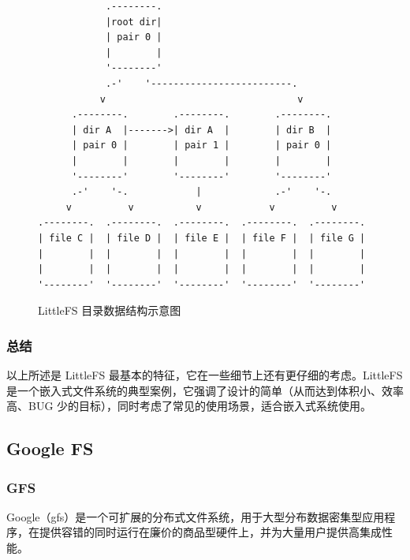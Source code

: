 \documentclass{ctexart}
\begin{document}
\begin{figure}
\begin{verbatim}
            .--------.
            |root dir|
            | pair 0 |
            |        |
            '--------'
            .-'    '-------------------------.
           v                                  v
      .--------.        .--------.        .--------.
      | dir A  |------->| dir A  |        | dir B  |
      | pair 0 |        | pair 1 |        | pair 0 |
      |        |        |        |        |        |
      '--------'        '--------'        '--------'
      .-'    '-.            |             .-'    '-.
     v          v           v            v          v
.--------.  .--------.  .--------.  .--------.  .--------.
| file C |  | file D |  | file E |  | file F |  | file G |
|        |  |        |  |        |  |        |  |        |
|        |  |        |  |        |  |        |  |        |
'--------'  '--------'  '--------'  '--------'  '--------'
\end{verbatim}
\caption{LittleFS 目录数据结构示意图}
\end{figure}

\subsubsection{总结}

以上所述是 LittleFS 最基本的特征，它在一些细节上还有更仔细的考虑。LittleFS 是一个嵌入式文件系统的典型案例，它强调了设计的简单（从而达到体积小、效率高、BUG 少的目标），同时考虑了常见的使用场景，适合嵌入式系统使用。

\subsection{Google FS}
\subsubsection{GFS}
Google（gfs）是一个可扩展的分布式文件系统，用于大型分布数据密集型应用程序，在提供容错的同时运行在廉价的商品型硬件上，并为大量用户提供高集成性能。\cite{GFS}
\end{document}
